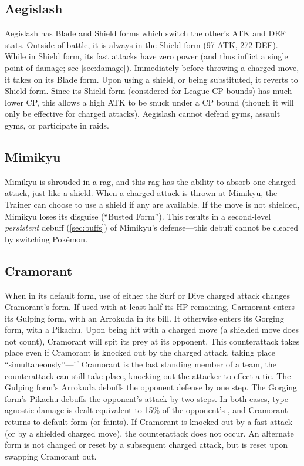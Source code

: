 \subsection{Aegislash\label{subsec:Aegislash}}
Aegislash has Blade and Shield forms which switch the other's ATK and DEF stats.
Outside of battle, it is always in the Shield form (97 ATK, 272 DEF).
While in Shield form, its fast attacks have zero power (and thus inflict
  a single point of damage; see \autoref{sec:damage}).
Immediately before throwing a charged move, it takes on its Blade form.
Upon using a shield, or being substituted, it reverts to Shield form.
Since its Shield form (considered for League CP bounds) has much lower CP,
 this allows a high ATK to be snuck under a CP bound (though it will only
 be effective for charged attacks).
Aegislash cannot defend gyms, assault gyms, or participate in raids.

\subsection{Mimikyu\label{subsec:Mimikyu}}
Mimikyu is shrouded in a rag, and this rag has the ability to absorb one charged attack,
just like a shield. When a charged attack is thrown at Mimikyu, the Trainer can choose
to use a shield if any are available. If the move is not shielded, Mimikyu loses its
disguise (``Busted Form''). This results in a second-level \textit{persistent} debuff (\ref{sec:buffs})
of Mimikyu's defense---this debuff cannot be cleared by switching Pokémon.

\subsection{Cramorant\label{subsec:Cramorant}}
When in its default form, use of either the Surf or Dive charged attack changes Cramorant's form.
If used with at least half its HP remaining, Carmorant enters its Gulping form, with an Arrokuda in its bill.
It otherwise enters its Gorging form, with a Pikachu.
Upon being hit with a charged move (a shielded move does not count), Cramorant will spit its prey at its opponent.
This counterattack takes place even if Cramorant is knocked out by the charged attack,
 taking place ``simultaneously''---if Cramorant is the last standing member of a
 team, the counterattack can still take place, knocking out the attacker to effect a tie.
The Gulping form's Arrokuda debuffs the opponent defense by one step.
The Gorging form's Pikachu debuffs the opponent's attack by two steps.
In both cases, type-agnostic damage is dealt equivalent to 15\% of the opponent's \MHP{}, and Cramorant returns to default form
 (or faints).
If Cramorant is knocked out by a fast attack (or by a shielded charged move), the counterattack does not occur.
An alternate form is not changed or reset by a subsequent charged attack,
 but is reset upon swapping Cramorant out.

